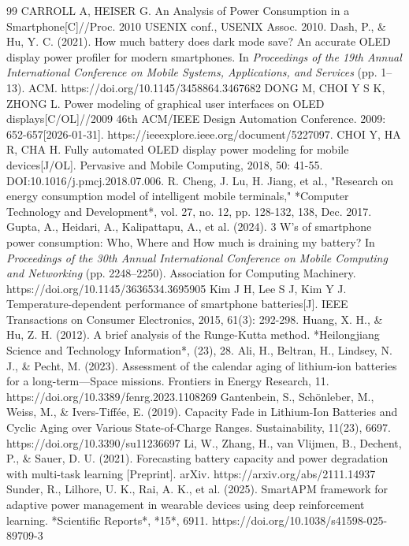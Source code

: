 \documentclass{mcmthesis}  %
\begin{document}
	\newpage
	\begin{thebibliography}{99}%
		 CARROLL A, HEISER G. An Analysis of Power Consumption in a Smartphone[C]//Proc. 2010 USENIX conf., USENIX Assoc. 2010.
		 Dash, P., \& Hu, Y. C. (2021). How much battery does dark mode save? An accurate OLED display power profiler for modern smartphones. In \textit{Proceedings of the 19th Annual International Conference on Mobile Systems, Applications, and Services} (pp. 1–13). ACM. https://doi.org/10.1145/3458864.3467682
		 DONG M, CHOI Y S K, ZHONG L. Power modeling of graphical user interfaces on OLED displays[C/OL]//2009 46th ACM/IEEE Design Automation Conference. 2009: 652-657[2026-01-31]. https://ieeexplore.ieee.org/document/5227097.
		 CHOI Y, HA R, CHA H. Fully automated OLED display power modeling for mobile devices[J/OL]. Pervasive and Mobile Computing, 2018, 50: 41-55. DOI:10.1016/j.pmcj.2018.07.006.
		 R. Cheng, J. Lu, H. Jiang, et al., "Research on energy consumption model of intelligent mobile terminals," *Computer Technology and Development*, vol. 27, no. 12, pp. 128-132, 138, Dec. 2017.
		 Gupta, A., Heidari, A., Kalipattapu, A., et al. (2024). 3 W’s of smartphone power consumption: Who, Where and How much is draining my battery? In \textit{Proceedings of the 30th Annual International Conference on Mobile Computing and Networking} (pp. 2248–2250). Association for Computing Machinery. https://doi.org/10.1145/3636534.3695905
		Kim J H, Lee S J, Kim Y J. Temperature-dependent performance of smartphone batteries[J]. IEEE Transactions on Consumer Electronics, 2015, 61(3): 292-298.
		Huang, X. H., \& Hu, Z. H. (2012). A brief analysis of the Runge-Kutta method. *Heilongjiang Science and Technology Information*, (23), 28.
		Ali, H., Beltran, H., Lindsey, N. J., \& Pecht, M. (2023). Assessment of the calendar aging of lithium-ion batteries for a long-term—Space missions. Frontiers in Energy Research, 11. https://doi.org/10.3389/fenrg.2023.1108269
		Gantenbein, S., Schönleber, M., Weiss, M., \& Ivers-Tiffée, E. (2019). Capacity Fade in Lithium-Ion Batteries and Cyclic Aging over Various State-of-Charge Ranges. Sustainability, 11(23), 6697. https://doi.org/10.3390/su11236697
		Li, W., Zhang, H., van Vlijmen, B., Dechent, P., \& Sauer, D. U. (2021). Forecasting battery capacity and power degradation with multi-task learning [Preprint]. arXiv. https://arxiv.org/abs/2111.14937
		Sunder, R., Lilhore, U. K., Rai, A. K., et al. (2025). SmartAPM framework for adaptive power management in wearable devices using deep reinforcement learning. *Scientific Reports*, *15*, 6911. https://doi.org/10.1038/s41598-025-89709-3
	\end{thebibliography}
	
\end{document}
